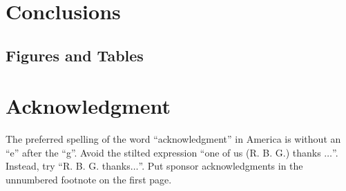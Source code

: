 \documentclass[conference]{IEEEtran}
\begin{document}




\section{Conclusions}

\subsection{Figures and Tables}

\section*{Acknowledgment}

The preferred spelling of the word ``acknowledgment'' in America is without 
an ``e'' after the ``g''. Avoid the stilted expression ``one of us (R. B. 
G.) thanks $\ldots$''. Instead, try ``R. B. G. thanks$\ldots$''. Put sponsor 
acknowledgments in the unnumbered footnote on the first page.


\printbibliography
\end{document}

